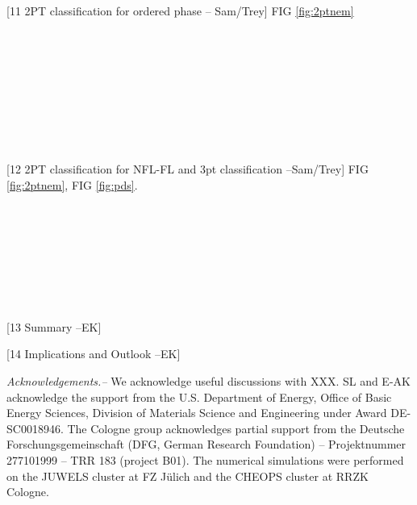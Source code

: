 \documentclass[amsmath,amssymb, aps, prx, longbibliography, twocolumn]{revtex4-1}
\begin{document}
[11 2PT classification for ordered phase -- Sam/Trey]
FIG \ref{fig:2ptnem}
\\
\\
\\
\\
\\
\\
\\
\\
\\
\\


[12 2PT classification for NFL-FL and 3pt classification --Sam/Trey]
FIG \ref{fig:2ptnem}, FIG \ref{fig:pds}.
\\
\\
\\
\\
\\
\\
\\
\\
\\

[13 Summary --EK]

[14 Implications and Outlook --EK]



{\it Acknowledgements.--} 
We acknowledge useful discussions with XXX. SL and E-AK acknowledge the support from the U.S. Department of Energy, Office of Basic Energy Sciences, Division of Materials Science and Engineering under Award DE-SC0018946.
The Cologne group acknowledges partial support from the Deutsche Forschungsgemeinschaft (DFG, German Research Foundation) -- Projektnummer 277101999 -- TRR 183 (project B01).
The numerical simulations were performed on the JUWELS cluster at FZ J\"ulich and the CHEOPS cluster at RRZK Cologne.


%
%
\appendix
\end{document}
